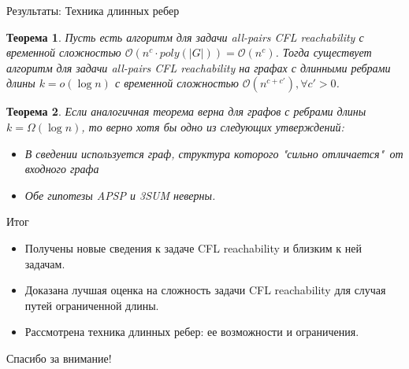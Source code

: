 \documentclass{beamer}
\newtheorem{theor}{Теорема}
\begin{document}
\begin{frame}{Результаты: Техника длинных ребер}
	\begin{theor}\label{theorem}
		Пусть есть алгоритм для задачи all-pairs CFL reachability с временной сложностью $\mathcal{O}(n^c \cdot poly(|G|)) = \mathcal{O}(n^c)$. Тогда существует алгоритм для задачи all-pairs CFL reachability на графах с длинными ребрами длины $k = o(\log n)$ с временной сложностью $\mathcal{O}(n^{c+c'}), \forall c' > 0$.
	\end{theor}
	
	\begin{theor}
		Если аналогичная теорема верна для графов с ребрами длины $k = \Omega(\log n)$, то верно хотя бы одно из следующих утверждений:
		
		 \begin{itemize}
		 	\item В сведении используется граф, структура которого "сильно отличается"$\,$ от входного графа
		 	\item Обе гипотезы APSP и 3SUM неверны. 
		 \end{itemize}
	\end{theor}
\end{frame}
	
\begin{frame}{Итог}
	\begin{itemize}
		\item Получены новые сведения к задаче CFL reachability и близким к ней задачам.
		\item Доказана лучшая оценка на сложность задачи CFL reachability для случая путей ограниченной длины.
		\item  Рассмотрена техника длинных ребер: ее возможности и ограничения.
	\end{itemize}
\end{frame}

\begin{frame}
	\begin{center}	
		\Large{Спасибо за внимание!}
	\end{center}
\end{frame}
\end{document}
